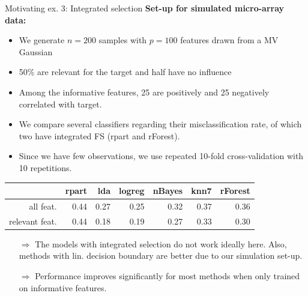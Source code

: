\documentclass[11pt,compress,t,notes=noshow, xcolor=table]{beamer}
\begin{document}
  \begin{vbframe}{Motivating ex. 3: Integrated selection}
\textbf{Set-up for simulated micro-array data:}
\vspace{0.5cm}
  \begin{itemize}
  \setlength{\itemsep}{1.2em}
  \item We generate $n=200$ samples with $p=100$ features drawn from a MV Gaussian
  \item 50\% are relevant for the target and half have no influence
  \item Among the informative features, 25 are positively and 25 negatively correlated with target.
  \end{itemize}

  \framebreak

  \begin{itemize}
  \setlength{\itemsep}{1.1em}
  \item We compare several classifiers regarding their misclassification rate, of which two have integrated FS (rpart and rForest).
  \item Since we have few observations, we use repeated 10-fold cross-validation with 10 repetitions.
  \end{itemize}
  \vspace{0.2cm}
  \begin{table}[ht]
    \begin{center}
      \begin{tabular}{rrrrrrr}
        \hline
        & rpart & lda & logreg & nBayes & knn7  & rForest \\
        \hline
        all feat. & 0.44 & 0.27 & 0.25 & 0.32 & 0.37 & 0.36 \\
        relevant feat. & 0.44 & 0.18 & 0.19 & 0.27 & 0.33 & 0.30 \\
        \hline
      \end{tabular}
    \end{center}
  \end{table}
\vspace{0.1cm}
\begin{itemize}
\setlength{\itemsep}{1.0em}
    \item[$\Rightarrow$] The models with integrated selection do not work ideally here. Also, methods with lin. decision boundary are better due to our simulation set-up.
    \item[$\Rightarrow$]   Performance improves significantly for most methods when only trained on informative features.
\end{itemize}

\end{vbframe}

  \endlecture
\end{document}
